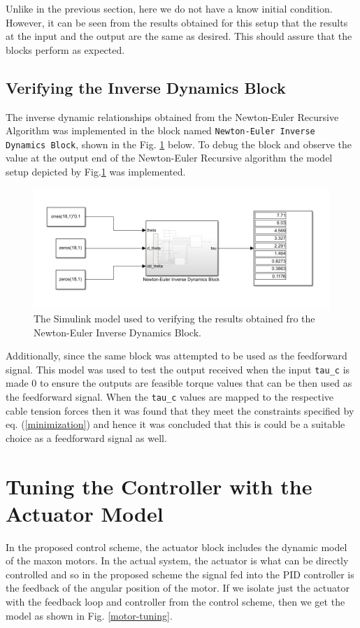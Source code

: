 \documentclass[a4paper,12pt]{report}
\begin{document}
Unlike in the previous section, here we do not have a know initial condition. However, it can be seen from the results obtained for this setup that the results at the input and the output are the same as desired. This should assure that the blocks perform as expected. 

\subsection{Verifying the Inverse Dynamics Block}

The inverse dynamic relationships obtained from the Newton-Euler Recursive Algorithm was implemented in the block named \texttt{Newton-Euler Inverse Dynamics Block}, shown in the Fig. \ref{ff-sim} below. To debug the block and observe the value at the output end of the Newton-Euler Recursive algorithm the model setup depicted by Fig.\ref{ff-sim} was implemented. 
\begin{figure}[H]
	\includegraphics[width=\textwidth]{images/feedforward-block.png}
	\caption{The Simulink model used to verifying the results obtained fro the Newton-Euler Inverse Dynamics Block.}
	\label{ff-sim}
\end{figure}
Additionally, since the same block was attempted to be used as the feedforward signal. This model was used to test the output received when the input \texttt{tau\_c} is made 0 to ensure the outputs are feasible torque values that can be then used as the feedforward signal. When the \texttt{tau\_c} values are mapped to the respective cable tension forces then it was found that they meet the constraints specified by eq. (\ref{minimization}) and hence it was concluded that this is could be a suitable choice as a feedforward signal as well.

\section{Tuning the Controller with the Actuator Model}
In the proposed control scheme, the actuator block includes the dynamic model of the maxon motors. In the actual system, the actuator is what can be directly controlled and so in the proposed scheme the signal fed into the PID controller is the feedback of the angular position of the motor. If we isolate just the actuator with the feedback loop and controller from the control scheme, then we get the model as shown in Fig. \ref{motor-tuning}. 
\end{document}
